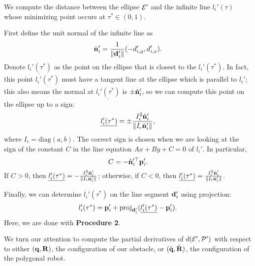 \begin{method}
We compute the distance between the ellipse ${\cal E}'$ and the infinite line $l_i'(\tau)$ whose minimizing point occurs at $\tau^* \in (0,1)$.

First define the unit normal of the infinite line as
\begin{equation}
\label{eq: unit_normal_di}
    \hat{\mathbf{n}}_i' = \frac{1}{\| \mathbf{d}_i' \|}(-d'_{i,y},d'_{i,x}).
\end{equation}
Denote $\underline{l_i'(\tau^*)}$ as the point on the ellipse that is closest to the $l_i'(\tau^*)$. In fact, this point $\underline{l_i'(\tau^*)}$ must have a tangent line at the ellipse which is parallel to $l_i'$; this also means the normal at $\underline{l_i'(\tau^*)}$ is $\pm \hat{\mathbf{n}}_i'$, so we can compute this point on the ellipse up to a sign:
\begin{equation}
\label{eq:closest_point_to_line}
    \underline{l_i'(\tau^*)} = \pm \frac{I_\epsilon^2 \hat{\mathbf{n}}_i'}{\| I_\epsilon \hat{\mathbf{n}}_i' \|},
\end{equation}
where $I_\epsilon = \text{diag}(a,b)$. The correct sign is chosen when we are looking at the sign of the constant $C$ in the line equation $Ax + By + C = 0$ of $l_i'$. In particular, 
\begin{equation}
\label{eq:line_equation_constant}
    C = -\hat{\mathbf{n}}_i'^\top \mathbf{p}_i'.
\end{equation}
If $C > 0$, then $\underline{l_i'(\tau^*)} = -\frac{I_\epsilon^2 \hat{\mathbf{n}}_i'}{\| I_\epsilon \hat{\mathbf{n}}_i' \|}$; otherwise, if $C < 0$, then $\underline{l_i'(\tau^*)} =  \frac{I_\epsilon^2 \hat{\mathbf{n}}_i'}{\| I_\epsilon \hat{\mathbf{n}}_i' \|}$.


Finally, we can determine $l_i'(\tau^*)$ on the line segment $\mathbf{d}_i'$ using projection:
%
\begin{equation}
\label{eq: ellipse_to_line_closestPoint}
    l_i'(\tau^*) = \mathbf{p}_i' + \text{proj}_{\mathbf{d}_i'} (\underline{l_i'(\tau^*)} - \mathbf{p}_i').
\end{equation}
Here, we are done with \textbf{Procedure 2}. 
\end{method}


We turn our attention to compute the partial derivatives of 
$d({\cal E}', {\cal P}')$ with respect to either $(\mathbf{q},\mathbf{R})$, the configuration of our obstacle, or $(\tilde{\mathbf{q}}, \tilde{\mathbf{R}})$, the configuration of the polygonal robot.


